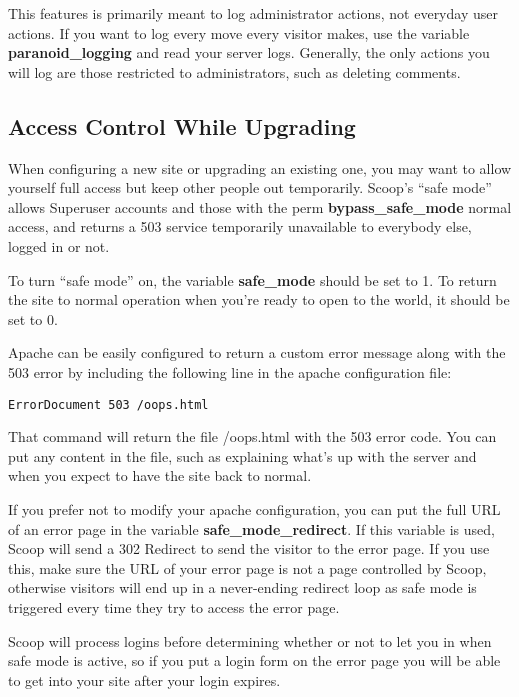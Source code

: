 This features is primarily meant to log administrator actions, not everyday user actions.  If you want to log every move every visitor makes, use the variable {\bf paranoid\_logging} and read your server logs.  Generally, the only actions you will log are those restricted to administrators, such as deleting comments.

\subsection{Access Control While Upgrading}
\label{features-safemode}

When configuring a new site or upgrading an existing one, you may want to allow yourself full access but keep other people out temporarily. Scoop's ``safe mode'' allows Superuser accounts and those with the perm {\bf bypass\_safe\_mode} normal access, and returns a 503 service temporarily unavailable to everybody else, logged in or not. 

To turn ``safe mode'' on, the variable {\bf safe\_mode} should be set to 1. To return the site to normal operation when you're ready to open to the world, it should be set to 0.

Apache can be easily configured to return a custom error message along with the 503 error by including the following line in the apache configuration file:

\begin{verbatim}
ErrorDocument 503 /oops.html
\end{verbatim}

That command will return the file /oops.html with the 503 error code. You can put any content in the file, such as explaining what's up with the server and when you expect to have the site back to normal.

If you prefer not to modify your apache configuration, you can put the full URL of an error page in the variable {\bf safe\_mode\_redirect}. If this variable is used, Scoop will send a 302 Redirect to send the visitor to the error page. If you use this, make sure the URL of your error page is not a page controlled by Scoop, otherwise visitors will end up in a never-ending redirect loop as safe mode is triggered every time they try to access the error page.

Scoop will process logins before determining whether or not to let you in when safe mode is active, so if you put a login form on the error page you will be able to get into your site after your login expires.

